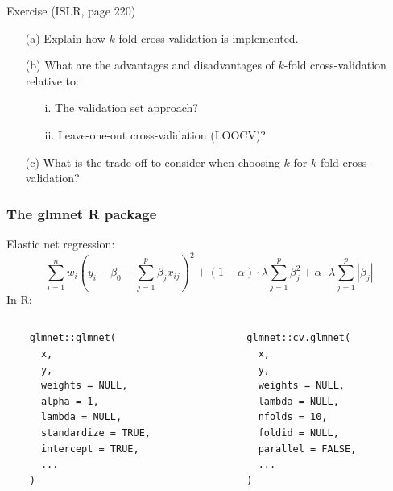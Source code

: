 \documentclass{beamer}
\begin{document}
  \begin{frame}{Exercise (ISLR, page 220)}
    \begin{itemize}
      \item[(a)] Explain how $k$-fold cross-validation is implemented.
      \item[(b)] What are the advantages and disadvantages of $k$-fold cross-validation relative to:
      \begin{itemize}
        \item[i.] The validation set approach?
        \item[ii.] Leave-one-out cross-validation (LOOCV)?
      \end{itemize}
      \item[(c)] What is the trade-off to consider when choosing $k$ for $k$-fold cross-validation?
    \end{itemize}
  \end{frame}

  \begin{frame}[fragile=singleslide]\frametitle{The glmnet R package}
    \small
    Elastic net regression:
    $$\sum_{i = 1}^n w_i \left(y_i - \beta_0 - \sum_{j = 1}^p \beta_j x_{ij}\right)^2 + (1 - \alpha) \cdot \lambda \sum_{j = 1}^p \beta_j^2 + \alpha \cdot \lambda \sum_{j = 1}^p |\beta_j|$$
    In R:
    \begin{columns}
      \begin{column}{0.5\textwidth}
        \begin{verbatim}
    glmnet::glmnet(
      x,
      y,
      weights = NULL,
      alpha = 1,
      lambda = NULL,
      standardize = TRUE,
      intercept = TRUE,
      ...
    )
      \end{verbatim}
      \end{column}
      \begin{column}{0.5\textwidth}
        \begin{verbatim}
    glmnet::cv.glmnet(
      x,
      y,
      weights = NULL,
      lambda = NULL,
      nfolds = 10,
      foldid = NULL,
      parallel = FALSE,
      ...
    )
      \end{verbatim}
      \end{column}
    \end{columns}
  \end{frame}
\end{document}
